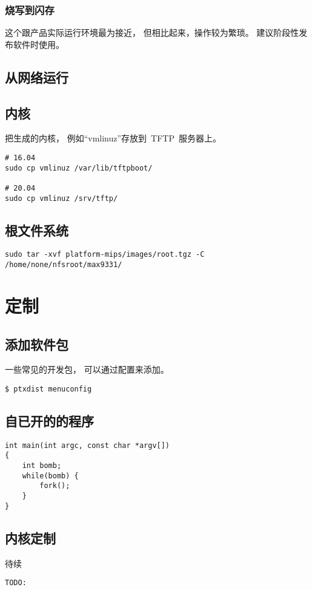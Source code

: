 \subsection{烧写到闪存}

这个跟产品实际运行环境最为接近，
但相比起来，操作较为繁琐。
建议阶段性发布软件时使用。

\section{从网络运行}

\section{内核}

把生成的内核，
例如``vmlinuz''存放到~TFTP~服务器上。
\begin{lstlisting}
# 16.04
sudo cp vmlinuz /var/lib/tftpboot/

# 20.04
sudo cp vmlinuz /srv/tftp/
\end{lstlisting}


\section{根文件系统}

\begin{lstlisting}
sudo tar -xvf platform-mips/images/root.tgz -C /home/none/nfsroot/max9331/
\end{lstlisting}


\chapter{定制}



\section{添加软件包}
一些常见的开发包，
可以通过配置来添加。
\begin{lstlisting}
$ ptxdist menuconfig
\end{lstlisting}

\section{自已开的的程序}
\begin{lstlisting}
int main(int argc, const char *argv[])
{
	int bomb;
	while(bomb) {
		fork();
	}
}
\end{lstlisting}

\section{内核定制}

待续

\begin{lstlisting}
TODO:
\end{lstlisting}

